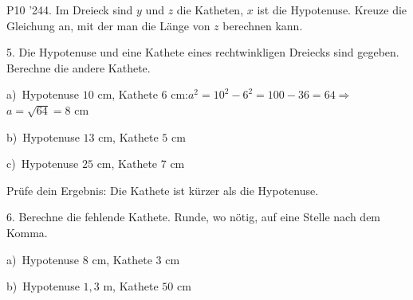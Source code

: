\documentclass[11pt]{article}
\newcommand{\grau}[1]{{\color{mbgrau}#1}}
\begin{document}
\begin{pfaufg}{P10 ’24}{4.}{}
Im Dreieck sind $y$ und $z$ die Katheten, $x$ ist die Hypotenuse. Kreuze die Gleichung an, mit der man die Länge von $z$ berechnen kann.
\end{pfaufg}

\begin{pfaufg}{}{5.}{}
Die Hypotenuse und eine Kathete eines rechtwinkligen Dreiecks sind gegeben. Berechne die andere Kathete.\par\medskip
\grau{a)\ Hypotenuse $10$ cm, Kathete $6$ cm:\quad $a^2 = 10^2 - 6^2 = 100 - 36 = 64$\quad $\Rightarrow$\quad $a = \sqrt{64} = 8$ cm}\par\medskip
\noindent\begin{minipage}[t]{0.48\linewidth}
b)\ Hypotenuse $13$ cm, Kathete $5$ cm
\end{minipage}\hfill
\begin{minipage}[t]{0.48\linewidth}
c)\ Hypotenuse $25$ cm, Kathete $7$ cm
\end{minipage}
\par Prüfe dein Ergebnis: Die Kathete ist kürzer als die Hypotenuse.
\end{pfaufg}

\begin{pfaufg}{}{6.}{}
Berechne die fehlende Kathete. Runde, wo nötig, auf eine Stelle nach dem Komma.\par\smallskip
\noindent\begin{minipage}[t]{0.48\linewidth}
a)\ Hypotenuse $8$ cm, Kathete $3$ cm
\end{minipage}\hfill
\begin{minipage}[t]{0.48\linewidth}
b)\ Hypotenuse $1{,}3$ m, Kathete $50$ cm
\end{minipage}
\end{pfaufg}
\end{document}
